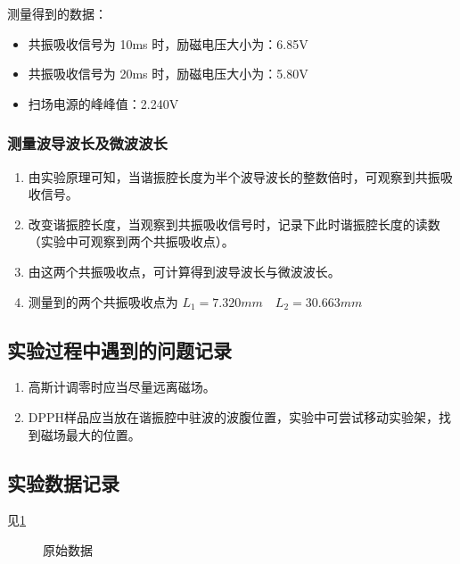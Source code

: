 \documentclass[dvipsnames, svgnames,a4paper,11pt]{article}
\begin{document}
		测量得到的数据：
		\begin{itemize}
			\item 共振吸收信号为 10ms 时，励磁电压大小为：6.85V
			\item 共振吸收信号为 20ms 时，励磁电压大小为：5.80V
			\item 扫场电源的峰峰值：2.240V
		\end{itemize}





	\subsubsection{测量波导波长及微波波长}
		
		\begin{enumerate}
			\item 由实验原理可知，当谐振腔长度为半个波导波长的整数倍时，可观察到共振吸收信号。
			\item 改变谐振腔长度，当观察到共振吸收信号时，记录下此时谐振腔长度的读数（实验中可观察到两个共振吸收点）。
			\item 由这两个共振吸收点，可计算得到波导波长与微波波长。
			\item 测量到的两个共振吸收点为 $L_1 = 7.320 mm \quad L_2 = 30.663 mm$
		\end{enumerate}



		


	\subsection{实验过程中遇到的问题记录}

		\begin{enumerate}
			\item 高斯计调零时应当尽量远离磁场。
			\item DPPH样品应当放在谐振腔中驻波的波腹位置，实验中可尝试移动实验架，找到磁场最大的位置。
				
		\end{enumerate}



\clearpage
\subsection{实验数据记录}

	见\cref{fig:data}

	\begin{figure}[htbp]
		\centering
		\quad
		\newline
		\quad

		\caption{原始数据}
		\label{fig:data}
	\end{figure}
	
\end{document}
